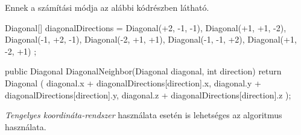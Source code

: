 Ennek a számítási módja az alábbi kódrészben látható.
\begin{cpp}  
Diagonal[] diagonalDirections = 
{ 
   Diagonal(+2, -1, -1), Diagonal(+1, +1, -2), Diagonal(-1, +2, -1), 
   Diagonal(-2, +1, +1), Diagonal(-1, -1, +2), Diagonal(+1, -2, +1)
};

public Diagonal DiagonalNeighbor(Diagonal diagonal, int direction)
{
   return Diagonal
   (
      diagonal.x + diagonalDirections[direction].x, 
      diagonal.y + diagonalDirections[direction].y, 
      diagonal.z + diagonalDirections[direction].z
   );
}         
\end{cpp}

\bigskip

\textit{Tengelyes koordináta-rendszer} használata esetén is lehetséges az algoritmus használata.

